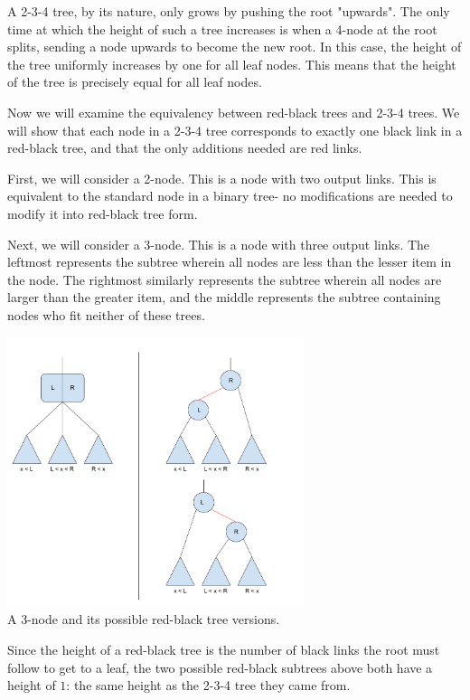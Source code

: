 \documentclass[12pt]{amsart}
\begin{document}
    A 2-3-4 tree, by its nature, only grows by pushing the root
    "upwards". The only time at which the height of such a tree
    increases is when a 4-node at the root splits, sending a
    node upwards to become the new root. In this case, the
    height of the tree uniformly increases by one for all leaf
    nodes. This means that the height of the tree is precisely
    equal for all leaf nodes.

    Now we will examine the equivalency between red-black trees
    and 2-3-4 trees. We will show that each node in a 2-3-4 tree
    corresponds to exactly one black link in a red-black tree,
    and that the only additions needed are red links.

    First, we will consider a 2-node. This is a node with two
    output links. This is equivalent to the standard node in a
    binary tree- no modifications are needed to modify it into
    red-black tree form.

    Next, we will consider a 3-node. This is a node with three
    output links. The leftmost represents the subtree wherein
    all nodes are less than the lesser item in the node. The
    rightmost similarly represents the subtree wherein all nodes
    are larger than the greater item, and the middle represents
    the subtree containing nodes who fit neither of these trees.

\begin{center}
    \includegraphics[width=0.65\textwidth]{rb_tree_1} \\
    A 3-node and its possible red-black tree versions. \\
    \vskip 1cm
\end{center}

    Since the height of a red-black tree is the number of black
    links the root must follow to get to a leaf, the two
    possible red-black subtrees above both have a height of $1$:
    the same height as the 2-3-4 tree they came from.
\end{document}
